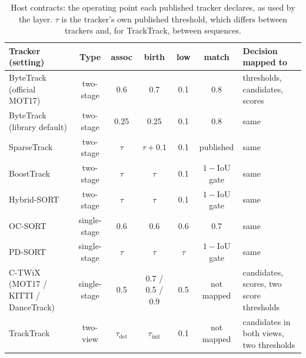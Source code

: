 \begin{table}[t]
\centering
\caption{Host contracts: the operating point each published tracker declares, as used by the layer. $\tau$ is the tracker's own published threshold, which differs between trackers and, for TrackTrack, between sequences.}
\label{tab:contracts}
\small
\begin{tabular}{p{3.4cm}cccccp{3.6cm}}
\hline
Tracker (setting) & Type & assoc & birth & low & match & Decision mapped to \\
\hline
ByteTrack (official MOT17) & two-stage & 0.6 & 0.7 & 0.1 & 0.8 & thresholds, candidates, scores \\
ByteTrack (library default) & two-stage & 0.25 & 0.25 & 0.1 & 0.8 & same \\
SparseTrack & two-stage & $\tau$ & $\tau+0.1$ & 0.1 & published & same \\
BoostTrack & two-stage & $\tau$ & $\tau$ & 0.1 & $1-$IoU gate & same \\
Hybrid-SORT & two-stage & $\tau$ & $\tau$ & 0.1 & $1-$IoU gate & same \\
OC-SORT & single-stage & 0.6 & 0.6 & 0.6 & 0.7 & same \\
PD-SORT & single-stage & $\tau$ & $\tau$ & $\tau$ & $1-$IoU gate & same \\
C-TWiX (MOT17 / KITTI / DanceTrack) & single-stage & 0.5 & 0.7 / 0.5 / 0.9 & 0.5 & not mapped & candidates, scores, two score thresholds \\
TrackTrack & two-view & $\tau_{\mathrm{det}}$ & $\tau_{\mathrm{init}}$ & 0.1 & not mapped & candidates in both views, two thresholds \\
\hline
\end{tabular}
\end{table}
